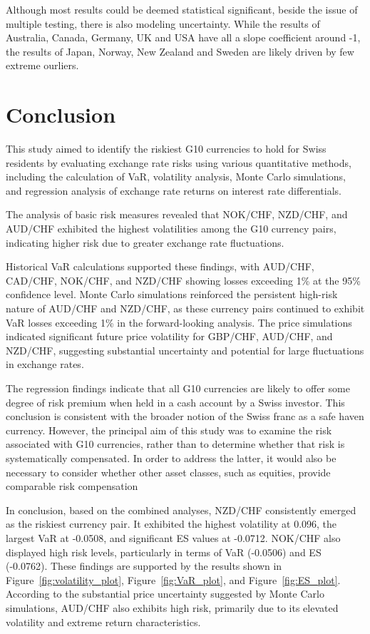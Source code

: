 \documentclass{article}
\begin{document}
Although most results could be deemed statistical significant, beside the issue of multiple testing, there is also modeling uncertainty. While the results of Australia, Canada, Germany, UK and USA have all a slope coefficient around -1, the results of Japan, Norway, New Zealand and Sweden are likely driven by few extreme ourliers.


\section{Conclusion}

This study aimed to identify the riskiest G10 currencies to hold for Swiss residents by evaluating exchange rate risks using various quantitative methods, including the calculation of VaR, volatility analysis, Monte Carlo simulations, and regression analysis of exchange rate returns on interest rate differentials.

The analysis of basic risk measures revealed that NOK/CHF, NZD/CHF, and AUD/CHF exhibited the highest volatilities among the G10 currency pairs, indicating higher risk due to greater exchange rate fluctuations. 

Historical VaR calculations supported these findings, with AUD/CHF, CAD/CHF, NOK/CHF, and NZD/CHF showing losses exceeding 1\% at the 95\% confidence level. Monte Carlo simulations reinforced the persistent high-risk nature of AUD/CHF and NZD/CHF, as these currency pairs continued to exhibit VaR losses exceeding 1\% in the forward-looking analysis. The price simulations indicated significant future price volatility for GBP/CHF, AUD/CHF, and NZD/CHF, suggesting substantial uncertainty and potential for large fluctuations in exchange rates.

The regression findings indicate that all G10 currencies are likely to offer some degree of risk premium when held in a cash account by a Swiss investor. This conclusion is consistent with the broader notion of the Swiss franc as a safe haven currency. However, the principal aim of this study was to examine the risk associated with G10 currencies, rather than to determine whether that risk is systematically compensated. In order to address the latter, it would also be necessary to consider whether other asset classes, such as equities, provide comparable risk compensation

In conclusion, based on the combined analyses, NZD/CHF consistently emerged as the riskiest currency pair. It exhibited the highest volatility at 0.096, the largest VaR at -0.0508, and significant ES values at -0.0712. NOK/CHF also displayed high risk levels, particularly in terms of VaR (-0.0506) and ES (-0.0762). These findings are supported by the results shown in Figure~\ref{fig:volatility_plot}, Figure~\ref{fig:VaR_plot}, and Figure~\ref{fig:ES_plot}. According to the substantial price uncertainty suggested by Monte Carlo simulations, AUD/CHF also exhibits high risk, primarily due to its elevated volatility and extreme return characteristics.
\end{document}
